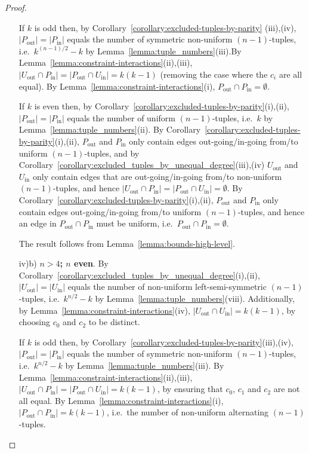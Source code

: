 \documentclass[a4paper,11pt]{article}
\begin{document}
\begin{proof}
\begin{itemize}
    If $k$ is odd then, by Corollary~\ref{corollary:excluded-tuples-by-parity} (iii),(iv),
    $|P_{\text{out}}|=|P_{\text{in}}|$ equals the number of symmetric non-uniform
    $(n-1)$-tuples, i.e.\ $k^{(n-1)/2}-k$ by Lemma~\ref{lemma:tuple_numbers}(iii).\newline By
    Lemma~\ref{lemma:constraint-interactions}(ii),(iii), $|U_{\text{out}}\cap
    P_{\text{in}}|=|P_{\text{out}}\cap U_{\text{in}}|=k(k-1)$ (removing the case where the
    $c_i$ are all equal).
    \newline By Lemma~\ref{lemma:constraint-interactions}(i), $P_{\text{out}}\cap
    P_{\text{in}}=\emptyset$.

    If $k$ is even then, by Corollary~\ref{corollary:excluded-tuples-by-parity}(i),(ii),
    $|P_{\text{out}}|=|P_{\text{in}}|$ equals the number of uniform $(n-1)$-tuples, i.e.\ $k$
    by Lemma~\ref{lemma:tuple_numbers}(ii).
    \newline By Corollary~\ref{corollary:excluded-tuples-by-parity}(i),(ii), $P_{\text{out}}$
    and $P_{\text{in}}$ only contain edges out-going/in-going from/to uniform $(n-1)$-tuples,
    and by Corollary~\ref{corollary:excluded_tuples_by_unequal_degree}(iii),(iv)
    $U_{\text{out}}$ and $U_{\text{in}}$ only contain edges that are out-going/in-going from/to
    non-uniform $(n-1)$-tuples, and hence $|U_{\text{out}}\cap
    P_{\text{in}}|=|P_{\text{out}}\cap U_{\text{in}}|=\emptyset$.
    \newline By Corollary~\ref{corollary:excluded-tuples-by-parity}(i),(ii), $P_{\text{out}}$
    and $P_{\text{in}}$ only contain edges out-going/in-going from/to uniform $(n-1)$-tuples,
    and hence an edge in $P_{\text{out}}\cap P_{\text{in}}$ must be uniform, i.e.\
    $P_{\text{out}}\cap P_{\text{in}}=\emptyset$.

    The result follows from Lemma~\ref{lemma:bounds-high-level}.

\item[iv)b)] {\bf $n>4$; $n$ even}. By
    Corollary~\ref{corollary:excluded_tuples_by_unequal_degree}(i),(ii),
    $|U_{\text{out}}|=|U_{\text{in}}|$ equals the number of non-uniform left-semi-symmetric
    $(n-1)$-tuples, i.e.\ $k^{n/2}-k$ by Lemma~\ref{lemma:tuple_numbers}(viii). Additionally,
    by Lemma~\ref{lemma:constraint-interactions}(iv), $|U_{\text{out}}\cap
    U_{\text{in}}|=k(k-1)$, by choosing $c_0$ and $c_2$ to be distinct.

    If $k$ is odd then, by Corollary~\ref{corollary:excluded-tuples-by-parity}(iii),(iv),
    $|P_{\text{out}}|=|P_{\text{in}}|$ equals the number of symmetric non-uniform
    $(n-1)$-tuples, i.e.\ $k^{n/2}-k$ by Lemma~\ref{lemma:tuple_numbers}(iii).
    \newline By Lemma~\ref{lemma:constraint-interactions}(ii),(iii), $|U_{\text{out}}\cap
    P_{\text{in}}|=|P_{\text{out}}\cap U_{\text{in}}|=k(k-1)$, by ensuring that $c_0$, $c_1$
    and $c_2$ are not all equal.
    \newline By Lemma~\ref{lemma:constraint-interactions}(i), $|P_{\text{out}}\cap P_{\text{in}}|=k(k-1)$,
    i.e.\ the number of non-uniform alternating $(n-1)$-tuples.


\end{itemize}
\end{proof}
\end{document}
